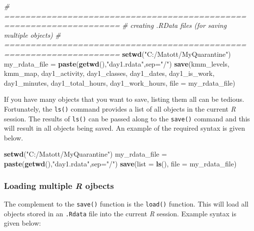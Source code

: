 \documentclass[
]{book}
\newenvironment{Shaded}{\begin{snugshade}}{\end{snugshade}}
\newcommand{\CommentTok}[1]{\textcolor[rgb]{0.56,0.35,0.01}{\textit{#1}}}
\newcommand{\DataTypeTok}[1]{\textcolor[rgb]{0.13,0.29,0.53}{#1}}
\newcommand{\KeywordTok}[1]{\textcolor[rgb]{0.13,0.29,0.53}{\textbf{#1}}}
\newcommand{\NormalTok}[1]{#1}
\newcommand{\StringTok}[1]{\textcolor[rgb]{0.31,0.60,0.02}{#1}}
\begin{document}
\begin{Shaded}
\begin{Highlighting}[]
\CommentTok{# ====================================================================}
\CommentTok{# creating .RData files (for saving multiple objects)}
\CommentTok{# ====================================================================}
\KeywordTok{setwd}\NormalTok{(}\StringTok{"C:/Matott/MyQuarantine"}\NormalTok{)}
\NormalTok{my_rdata_file =}\StringTok{ }\KeywordTok{paste}\NormalTok{(}\KeywordTok{getwd}\NormalTok{(),}\StringTok{"day1.rdata"}\NormalTok{,}\DataTypeTok{sep=}\StringTok{"/"}\NormalTok{)}
\KeywordTok{save}\NormalTok{(kmm_levels, kmm_map,}
\NormalTok{     day1_activity, day1_classes, day1_dates, day1_is_work, }
\NormalTok{     day1_minutes, day1_total_hours, day1_work_hours, }
     \DataTypeTok{file =}\NormalTok{ my_rdata_file)}
\end{Highlighting}
\end{Shaded}

If you have many objects that you want to save, listing them all can be tedious. Fortunately, the \texttt{ls()} command provides a list of all objects in the current \emph{R} session. The results of \texttt{ls()} can be passed along to the \texttt{save()} command and this will result in all objects being saved. An example of the required syntax is given below.

\begin{Shaded}
\begin{Highlighting}[]
\KeywordTok{setwd}\NormalTok{(}\StringTok{"C:/Matott/MyQuarantine"}\NormalTok{)}
\NormalTok{my_rdata_file =}\StringTok{ }\KeywordTok{paste}\NormalTok{(}\KeywordTok{getwd}\NormalTok{(),}\StringTok{"day1.rdata"}\NormalTok{,}\DataTypeTok{sep=}\StringTok{"/"}\NormalTok{)}
\KeywordTok{save}\NormalTok{(}\DataTypeTok{list =} \KeywordTok{ls}\NormalTok{(), }\DataTypeTok{file =}\NormalTok{ my_rdata_file)}
\end{Highlighting}
\end{Shaded}

\hypertarget{loading-multiple-r-ojbects}{%
\subsubsection*{\texorpdfstring{Loading multiple \emph{R} ojbects}{Loading multiple R ojbects}}\label{loading-multiple-r-ojbects}}

The complement to the \texttt{save()} function is the \texttt{load()} function. This will load all objects stored in an \texttt{.Rdata} file into the current \emph{R} session. Example syntax is given below:
\end{document}
